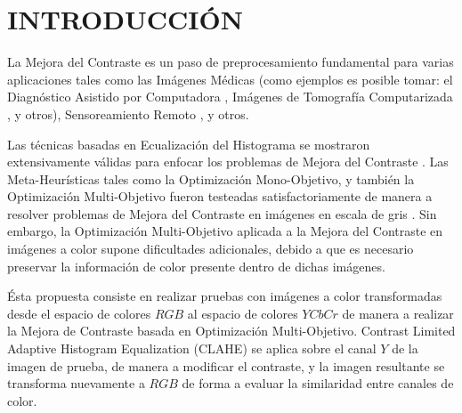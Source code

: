 \chapter{INTRODUCCIÓN}

La Mejora del Contraste es un paso de preprocesamiento fundamental para varias aplicaciones tales como las Imágenes Médicas (como ejemplos es posible tomar: el Diagnóstico Asistido por Computadora \cite{doi2007computer}, Imágenes de Tomografía Computarizada \cite{doi:10.1056/NEJM199303113281008}, y otros), Sensoreamiento Remoto \cite{lillesand2014remote}, y otros.

Las técnicas basadas en Ecualización del Histograma se mostraron extensivamente válidas para enfocar los problemas de Mejora del Contraste \cite{Gonzalez02a,pizer1987adaptive,zuiderveld1994contrast,580378}. Las Meta-Heurísticas tales como la Optimización Mono-Objetivo, y también la Optimización Multi-Objetivo fueron testeadas satisfactoriamente de manera a resolver problemas de Mejora del Contraste en imágenes en escala de gris \cite{morepso,more2015parameter,812529,HOSEINI2013879}. Sin embargo, la Optimización Multi-Objetivo aplicada a la Mejora del Contraste en imágenes a color supone dificultades adicionales, debido a que es necesario preservar la información de color presente dentro de dichas imágenes.

Ésta propuesta consiste en realizar pruebas con imágenes a color transformadas desde el espacio de colores $RGB$ al espacio de colores $YCbCr$ de manera a realizar la Mejora de Contraste basada en Optimización Multi-Objetivo. Contrast Limited Adaptive Histogram Equalization (CLAHE) se aplica sobre el canal $Y$ de la imagen de prueba, de manera a modificar el contraste, y la imagen resultante se transforma nuevamente a $RGB$ de forma a evaluar la similaridad entre canales de color.




